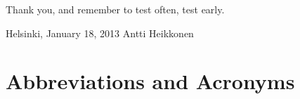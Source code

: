 \documentclass[12pt,a4paper,oneside,pdftex]{report}
\newcommand{\DATE}{January 18, 2013}
\newcommand{\AUTHOR}{Antti Heikkonen}
\begin{document}
Thank you, and remember to test often, test early.
\vskip 10mm

\noindent Helsinki, \DATE
\vskip 5mm
\noindent\AUTHOR

\cleardoublepage
% 

\chapter*{Abbreviations and Acronyms}

\end{document}
